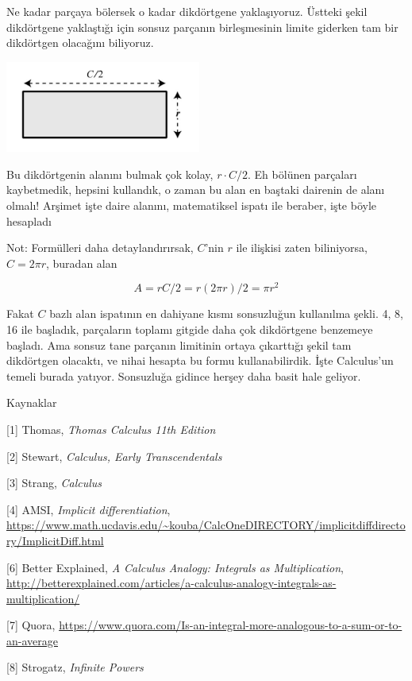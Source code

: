 \documentclass[12pt,fleqn]{article}\usepackage{../../common}
\begin{document}
Ne kadar parçaya bölersek o kadar dikdörtgene yaklaşıyoruz. Üstteki şekil
dikdörtgene yaklaştığı için sonsuz parçanın birleşmesinin limite giderken
tam bir dikdörtgen olacağını biliyoruz. 

\includegraphics[height=3cm]{circ_7.png}

Bu dikdörtgenin alanını bulmak çok kolay, $r \cdot C/2$. Eh bölünen parçaları
kaybetmedik, hepsini kullandık, o zaman bu alan en baştaki dairenin de alanı
olmalı! Arşimet işte daire alanını, matematiksel ispatı ile beraber, işte böyle
hesapladı

Not: Formülleri daha detaylandırırsak, $C$'nin $r$ ile ilişkisi zaten
biliniyorsa, $C = 2 \pi r$, buradan alan

$$
A = r C/2 = r (2 \pi r)/2 = \pi r^2 
$$

Fakat $C$ bazlı alan ispatının en dahiyane kısmı sonsuzluğun kullanılma
şekli. 4, 8, 16 ile başladık, parçaların toplamı gitgide daha çok dikdörtgene
benzemeye başladı. Ama sonsuz tane parçanın limitinin ortaya çıkarttığı şekil
tam dikdörtgen olacaktı, ve nihai hesapta bu formu kullanabilirdik. İşte
Calculus'un temeli burada yatıyor. Sonsuzluğa gidince herşey daha basit hale
geliyor.



Kaynaklar

[1] Thomas, {\em Thomas Calculus 11th Edition}

[2] Stewart, {\em Calculus, Early Transcendentals}

[3] Strang, {\em Calculus}

[4] AMSI, {\em Implicit differentiation},
    \url{https://www.math.ucdavis.edu/~kouba/CalcOneDIRECTORY/implicitdiffdirectory/ImplicitDiff.html}

[6] Better Explained, {\em A Calculus Analogy: Integrals as  Multiplication},
    \url{http://betterexplained.com/articles/a-calculus-analogy-integrals-as-multiplication/}

[7] Quora, \url{https://www.quora.com/Is-an-integral-more-analogous-to-a-sum-or-to-an-average}

[8] Strogatz, {\em Infinite Powers}
\end{document}
